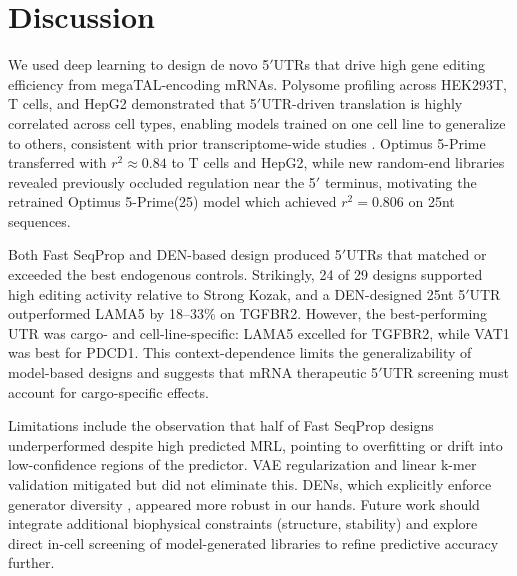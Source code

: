 \documentclass[11pt]{article}
\begin{document}
\section{Discussion}
We used deep learning to design de novo 5$'$UTRs that drive high gene editing efficiency from megaTAL-encoding mRNAs. Polysome profiling across HEK293T, T cells, and HepG2 demonstrated that 5$'$UTR-driven translation is highly correlated across cell types, enabling models trained on one cell line to generalize to others, consistent with prior transcriptome-wide studies \cite{cenik2015integrative,blair2017dissection}. Optimus 5-Prime transferred with $r^2 \approx 0.84$ to T cells and HepG2, while new random-end libraries revealed previously occluded regulation near the 5$'$ terminus, motivating the retrained Optimus 5-Prime(25) model which achieved $r^2 = 0.806$ on 25nt sequences.

Both Fast SeqProp and DEN-based design produced 5$'$UTRs that matched or exceeded the best endogenous controls. Strikingly, 24 of 29 designs supported high editing activity relative to Strong Kozak, and a DEN-designed 25nt 5$'$UTR outperformed LAMA5 by 18--33\% on TGFBR2. However, the best-performing UTR was cargo- and cell-line-specific: LAMA5 excelled for TGFBR2, while VAT1 was best for PDCD1. This context-dependence limits the generalizability of model-based designs and suggests that mRNA therapeutic 5$'$UTR screening must account for cargo-specific effects.

Limitations include the observation that half of Fast SeqProp designs underperformed despite high predicted MRL, pointing to overfitting or drift into low-confidence regions of the predictor. VAE regularization and linear k-mer validation mitigated but did not eliminate this. DENs, which explicitly enforce generator diversity \cite{linder2020generative}, appeared more robust in our hands. Future work should integrate additional biophysical constraints (structure, stability) and explore direct in-cell screening of model-generated libraries to refine predictive accuracy further.



\end{document}
